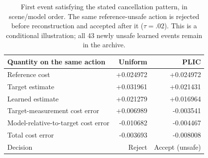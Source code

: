 \begin{table}[t]
\centering\small
\caption{First event satisfying the stated cancellation pattern, in scene/model order. The same reference-unsafe action is rejected before reconstruction and accepted after it ($\tau=.02$). This is a conditional illustration; all 43 newly unsafe learned events remain in the archive.}
\label{tab:cancellation}
\begin{tabular}{lrr}
\toprule
Quantity on the same action & Uniform & PLIC\\
\midrule
Reference cost & +0.024972 & +0.024972\\
Target estimate & +0.031961 & +0.021431\\
Learned estimate & +0.021279 & +0.016964\\
Target-measurement cost error & +0.006989 & -0.003541\\
Model-relative-to-target cost error & -0.010682 & -0.004467\\
Total cost error & -0.003693 & -0.008008\\
Decision & Reject & Accept (unsafe)\\
\bottomrule
\end{tabular}
\end{table}
